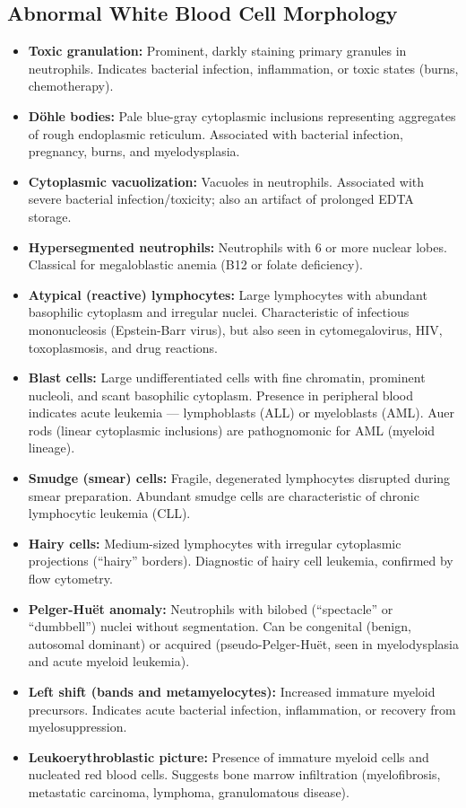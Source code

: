 \subsection*{Abnormal White Blood Cell Morphology}
\begin{itemize}
  \item \textbf{Toxic granulation:} Prominent, darkly staining primary granules in neutrophils. Indicates bacterial infection, inflammation, or toxic states (burns, chemotherapy).
  \item \textbf{D\"{o}hle bodies:} Pale blue-gray cytoplasmic inclusions representing aggregates of rough endoplasmic reticulum. Associated with bacterial infection, pregnancy, burns, and myelodysplasia.
  \item \textbf{Cytoplasmic vacuolization:} Vacuoles in neutrophils. Associated with severe bacterial infection/toxicity; also an artifact of prolonged EDTA storage.
  \item \textbf{Hypersegmented neutrophils:} Neutrophils with 6 or more nuclear lobes. Classical for megaloblastic anemia (B12 or folate deficiency).
  \item \textbf{Atypical (reactive) lymphocytes:} Large lymphocytes with abundant basophilic cytoplasm and irregular nuclei. Characteristic of infectious mononucleosis (Epstein-Barr virus), but also seen in cytomegalovirus, HIV, toxoplasmosis, and drug reactions.
  \item \textbf{Blast cells:} Large undifferentiated cells with fine chromatin, prominent nucleoli, and scant basophilic cytoplasm. Presence in peripheral blood indicates acute leukemia --- lymphoblasts (ALL) or myeloblasts (AML). Auer rods (linear cytoplasmic inclusions) are pathognomonic for AML (myeloid lineage).
  \item \textbf{Smudge (smear) cells:} Fragile, degenerated lymphocytes disrupted during smear preparation. Abundant smudge cells are characteristic of chronic lymphocytic leukemia (CLL).
  \item \textbf{Hairy cells:} Medium-sized lymphocytes with irregular cytoplasmic projections (``hairy'' borders). Diagnostic of hairy cell leukemia, confirmed by flow cytometry.
  \item \textbf{Pelger-Hu\"{e}t anomaly:} Neutrophils with bilobed (``spectacle'' or ``dumbbell'') nuclei without segmentation. Can be congenital (benign, autosomal dominant) or acquired (pseudo-Pelger-Hu\"{e}t, seen in myelodysplasia and acute myeloid leukemia).
  \item \textbf{Left shift (bands and metamyelocytes):} Increased immature myeloid precursors. Indicates acute bacterial infection, inflammation, or recovery from myelosuppression.
  \item \textbf{Leukoerythroblastic picture:} Presence of immature myeloid cells and nucleated red blood cells. Suggests bone marrow infiltration (myelofibrosis, metastatic carcinoma, lymphoma, granulomatous disease).
\end{itemize}


